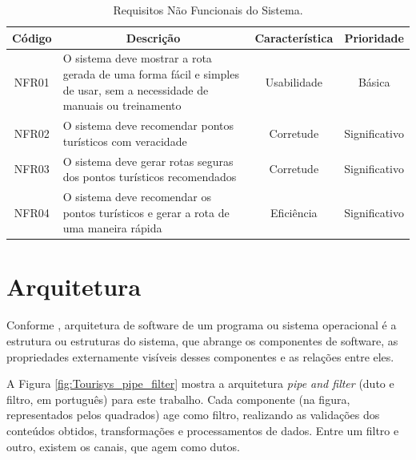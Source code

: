 \begin{table}[H]
    \centering
    \begin{tabular}{|c|p{8.3cm}|c|c|}
        \hline
		
		\multicolumn{1}{|c|}{\bfseries Código} & \multicolumn{1}{c|}{\bfseries Descrição} & \multicolumn{1}{c|}{\bfseries Característica} & \multicolumn{1}{c|}{\bfseries Prioridade}
		\\ \hline
		
        NFR01 & O sistema deve mostrar a rota gerada de uma forma fácil e simples de usar, sem a necessidade de manuais ou treinamento & Usabilidade & Básica \\ \hline
        NFR02 & O sistema deve recomendar pontos turísticos com veracidade & Corretude & Significativo \\ \hline
        NFR03 & O sistema deve gerar rotas seguras dos pontos turísticos recomendados & Corretude & Significativo \\ \hline
        NFR04 & O sistema deve recomendar os pontos turísticos e gerar a rota de uma maneira rápida & Eficiência & Significativo \\ \hline
    \end{tabular}
    \caption{Requisitos Não Funcionais do Sistema.}
    \label{tab:non-functional_requirement}
\end{table}

\section{Arquitetura}
\label{sec:architecture}

Conforme \cite{Bass:2012:SAP:2392670}, arquitetura de software de um programa ou sistema operacional é a estrutura ou estruturas do sistema, que abrange os componentes de software, as propriedades externamente visíveis desses componentes e as relações entre eles.


A Figura \ref{fig:Tourisys_pipe_filter} mostra a arquitetura \textit{pipe and filter} (duto e filtro, em português) para este trabalho. Cada componente (na figura, representados pelos quadrados) age como filtro, realizando as validações dos conteúdos obtidos, transformações e processamentos de dados. Entre um filtro e outro, existem os canais, que agem como dutos.

